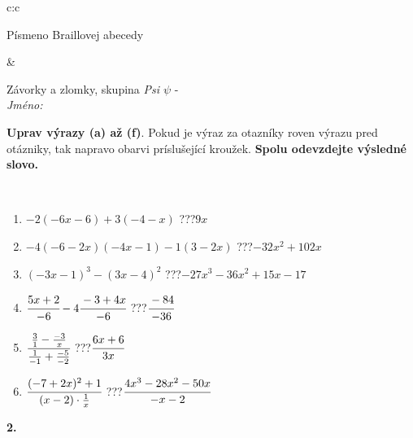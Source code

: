\documentclass[10pt]{report}
\begin{document}
\begin{tabular}{c:c}
\begin{minipage}[c][104.5mm][t]{0.5\linewidth}
\begin{center}
\begin{minipage}{0.20\linewidth}
\begin{center}
{\small Písmeno Braillovej abecedy}
\end{center}
\end{minipage}
\end{center}
\end{minipage}
&
\begin{minipage}[c][104.5mm][t]{0.5\linewidth}
\begin{center}
\vspace{7mm}
{\huge Závorky a zlomky, skupina \textit{Psi $\psi$} -}\\[5mm]
\textit{Jméno:}\phantom{xxxxxxxxxxxxxxxxxxxxxxxxxxxxxxxxxxxxxxxxxxxxxxxxxxxxxxxxxxxxxxxxx}\\[5mm]
\begin{minipage}{0.95\linewidth}
\begin{center}
\textbf{Uprav výrazy (a) až (f)}. Pokud je výraz za otazníky roven výrazu pred otázniky, tak napravo obarvi príslušející kroužek. \textbf{Spolu odevzdejte výsledné slovo.}
\end{center}
\end{minipage}
\\[1mm]
\begin{minipage}{0.79\linewidth}
\begin{center}
\begin{varwidth}{\linewidth}
\begin{enumerate}
\normalsize
\item $-2(-6x-6)+3(-4-x)$\quad \dotfill\; ???\;\dotfill \quad $9x$
\item $-4(-6-2x)(-4x-1)-1(3-2x)$\quad \dotfill\; ???\;\dotfill \quad $-32x^2+102x$
\item $(-3x-1)^3-(3x-4)^2$\quad \dotfill\; ???\;\dotfill \quad $-27x^3-36x^2+15x-17$
\item $\cfrac{5x+2}{-6}-4\cfrac{-3+4x}{-6}$\quad \dotfill\; ???\;\dotfill \quad $\cfrac{-84}{-36}$
\item $\cfrac{\frac{3}{1}-\frac{-3}{x}}{\frac{1}{-1}+\frac{-5}{-2}}$\quad \dotfill\; ???\;\dotfill \quad $\cfrac{6x+6}{3x}$
\item $\cfrac{(-7+2x)^2+1}{(x-2)\cdot\frac{1}{x}}$\quad \dotfill\; ???\;\dotfill \quad $\cfrac{4x^3-28x^2-50x}{-x-2}$
\end{enumerate}
\end{varwidth}
\end{center}
\end{minipage}
\begin{minipage}{0.20\linewidth}
\begin{center}
{\Huge\bfseries 2.} \\[2mm]

\end{center}
\end{minipage}
\end{center}
\end{minipage}
\end{tabular}
\end{document}
